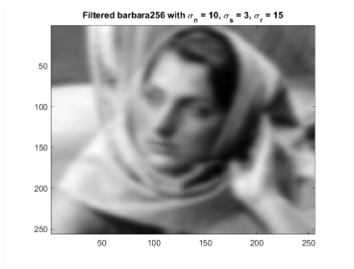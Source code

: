 \documentclass{article}
\begin{document}
\begin{figure}[!htb]
\begin{minipage}[b]{0.3\textwidth}
        \includegraphics[width=\textwidth]{barbara256_10_3_15_17.png}
    \end{minipage}
\end{figure}
\end{document}
